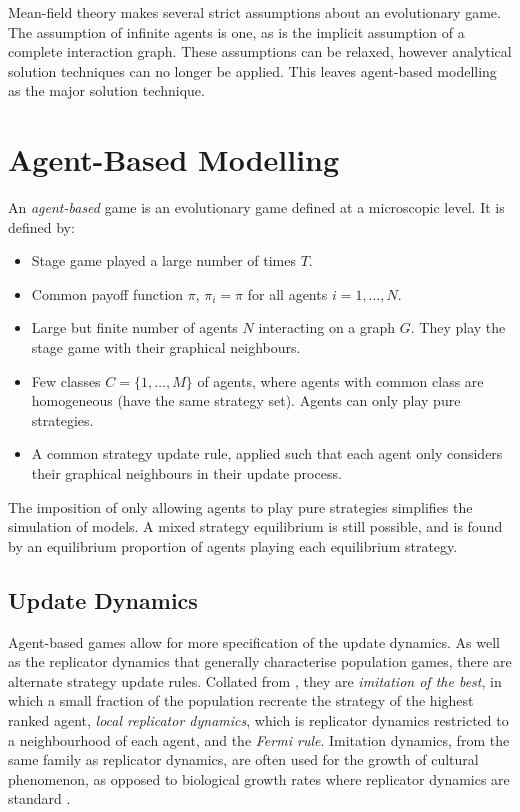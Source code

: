 Mean-field theory makes several strict assumptions about an evolutionary game. The assumption of infinite agents is one, as is the implicit assumption of a complete interaction graph. These assumptions can be relaxed, however analytical solution techniques can no longer be applied. This leaves agent-based modelling as the major solution technique. 


\section{Agent-Based Modelling} \label{ABM}

An \emph{agent-based} game is an evolutionary game defined at a microscopic level. It is defined by: 

\begin{itemize}
    \item Stage game played a large number of times $T$.
    \item  Common payoff function $\pi$,  $\pi_i = \pi$ for all agents $i = 1,\dots, N$. 
    \item Large but finite number of agents $N$ interacting on a graph $G$. They play the stage game with their graphical neighbours.
    \item Few classes $C = \{1,\dots, M\}$ of agents, where agents with common class are homogeneous (have the same strategy set). Agents can only play pure strategies.
    \item A common strategy update rule, applied such that each agent only considers their graphical neighbours in their update process.
\end{itemize}
The imposition of only allowing agents to play pure strategies simplifies the simulation of models. A mixed strategy equilibrium is still possible, and is found by an equilibrium proportion of agents playing each equilibrium strategy. 

\subsection{Update Dynamics} \label{UD}
Agent-based games allow for more specification of the update dynamics. As well as the replicator dynamics that generally characterise population games, there are alternate strategy update rules. Collated from \cite{RN43}, they are \emph{imitation of the best}, in which a small fraction of the population recreate the strategy of the highest ranked agent, \emph{local replicator dynamics}, which is replicator dynamics restricted to a neighbourhood of each agent, and the \emph{Fermi rule}. Imitation dynamics, from the same family as replicator dynamics, are often used for the growth of cultural phenomenon, as opposed to biological growth rates where replicator dynamics are standard \cite{RN30}.\\


